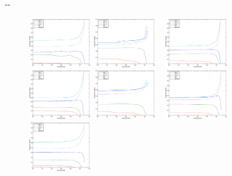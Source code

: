 \documentclass{article}
\begin{document}
\begin{figure}[H]
\begin{adjustwidth}{-\oddsidemargin}{-\rightmargin}
\begin{subfigure}{0.8\paperwidth}
      \includegraphics[width=0.3\textwidth]{figures/sparsity_60_49_cross.eps}    
      \includegraphics[width=0.3\textwidth]{figures/sparsity_61_47_cross.eps} ~
      \includegraphics[width=0.3\textwidth]{figures/sparsity_61_48_cross.eps} ~
      \includegraphics[width=0.3\textwidth]{figures/sparsity_61_49_cross.eps}    
      \includegraphics[width=0.3\textwidth]{figures/sparsity_62_47_cross.eps} ~
      \includegraphics[width=0.3\textwidth]{figures/sparsity_62_48_cross.eps} ~
      \includegraphics[width=0.3\textwidth]{figures/sparsity_62_49_cross.eps}  

\end{subfigure}
\end{adjustwidth}
\end{figure}
\end{document}
